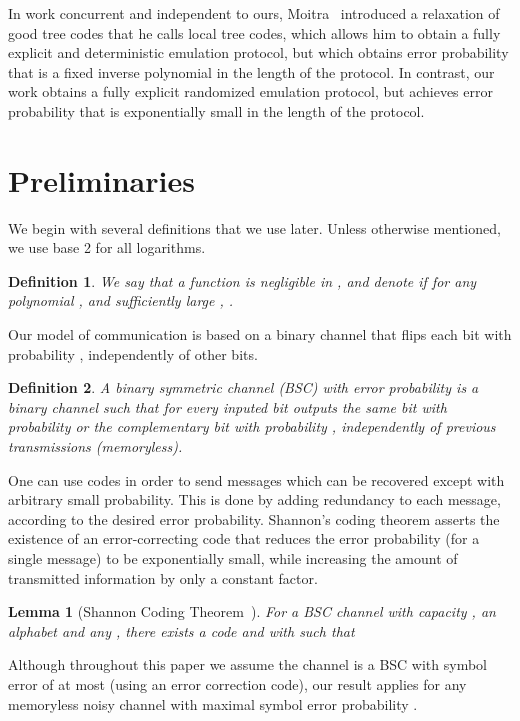 \documentclass[ letterpaper, 11pt]{article}
\newtheorem{definition}{Definition}
\newtheorem{lemma}[theorem]{Lemma}
\begin{document}
In work concurrent and independent to ours, Moitra~\cite{Moitra11}
introduced a relaxation of good tree codes that he calls local tree
codes, which allows him to obtain a fully explicit and deterministic
emulation protocol, but which obtains error probability that is a
fixed inverse polynomial in the length of the protocol.  In
contrast, our work obtains a fully explicit randomized emulation
protocol, but achieves error probability that is exponentially small
in the length of the protocol.





\section{Preliminaries}\label{sec:pre}


We begin with several definitions that we use later.
Unless otherwise mentioned, we use base 2 for all logarithms.
\begin{definition}
We say that a function  is negligible in , and denote 
if for any polynomial , and sufficiently large  ,
.
\end{definition}
Our model of communication is based on a binary channel that flips each
bit with probability , independently of other bits.
\begin{definition}
A binary symmetric channel (BSC) with error probability 
is a binary channel  such that for every inputed bit
outputs the same bit with probability  or the complementary bit
with probability , independently of previous transmissions (memoryless).
\end{definition}

One can use codes in order
to send messages which can be recovered except with arbitrary small probability.
This is done by adding redundancy to each message, according to the desired
error probability.
Shannon's coding theorem asserts the existence of an error-correcting code that reduces the
error probability (for a single message) to be exponentially small,
while increasing the amount of transmitted information
by only a constant factor.

\begin{lemma}[Shannon Coding Theorem~\cite{shannon48}]\label{lem:shannon}
For a BSC channel with capacity , an alphabet  and any , there exists a code
 and  with  such that

\end{lemma}
\noindent
Although throughout this paper we assume the channel is a BSC with symbol error of at most  (using an error correction code), our result applies for any memoryless noisy channel with maximal symbol error probability .
\end{document}
